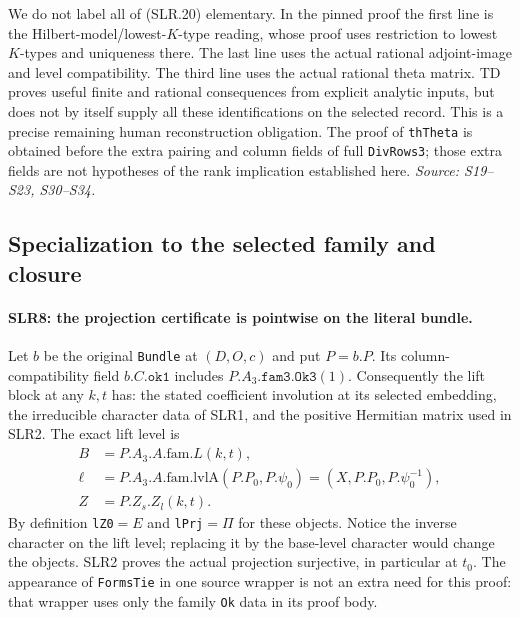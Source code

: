 We do not label all of (SLR.20) elementary.  In the pinned proof the
first line is the Hilbert-model/lowest-$K$-type reading, whose proof
uses restriction to lowest $K$-types and uniqueness there.  The last
line uses the actual rational adjoint-image and level compatibility.
The third line uses the actual rational theta matrix.  TD proves useful
finite and rational consequences from explicit analytic inputs, but
does not by itself supply all these identifications on the selected
record.  This is a precise remaining human reconstruction obligation.
The proof of \texttt{thTheta} is obtained before the extra pairing
and column fields of full \texttt{DivRows3}; those extra fields are
not hypotheses of the rank implication established here.
\emph{Source: S19--S23, S30--S34.}

\subsection{Specialization to the selected family and closure}

\paragraph{SLR8: the projection certificate is pointwise on the literal bundle.}
\label{claim:SLR8}
Let $b$ be the original \texttt{Bundle} at $(D,O,c)$ and put $P=b.P$.
Its column-compatibility field $b.C.\texttt{ok1}$ includes
$P.A_3.\texttt{fam3.Ok3}(1)$.  Consequently the lift block at any
$k,t$ has: the stated coefficient involution at its selected embedding,
the irreducible character data of SLR1, and the positive Hermitian
matrix used in SLR2.  The exact lift level is
\[
 \begin{aligned}
 B&=P.A_3.A.\mathrm{fam}.L(k,t),\\
 \ell&=P.A_3.A.\mathrm{fam}.\mathrm{lvlA}(P.P_0,P.\psi_0)
          =(X,P.P_0,P.\psi_0^{-1}),\\
 Z&=P.Z_s.Z_l(k,t).
 \end{aligned}                                           \tag{SLR.21}
\]
By definition \texttt{lZ0}$=E$ and \texttt{lPrj}$=\Pi$ for these
objects.  Notice the inverse character on the lift level; replacing
it by the base-level character would change the objects.
SLR2 proves the actual projection surjective, in particular at $t_0$.
The appearance of \texttt{FormsTie} in one source wrapper is not an
extra need for this proof: that wrapper uses only the family
\texttt{Ok} data in its proof body.

